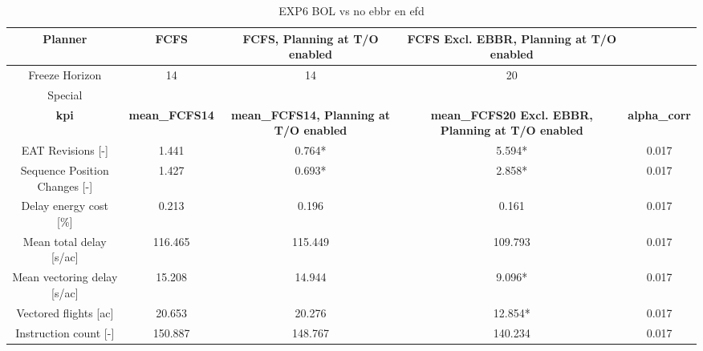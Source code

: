 \begin{table}[htbp]
\caption{EXP6 BOL vs no ebbr en efd}
\begin{center}
\footnotesize
\setlength{\tabcolsep}{3pt}
\renewcommand{\arraystretch}{1.000}
\begin{tabular}{|c|c|c|c|c|}
\hline
Planner & FCFS & FCFS, Planning at T/O enabled & FCFS Excl. EBBR, Planning at T/O enabled &  \\
\hline
Freeze Horizon & 14 & 14 & 20 &  \\
\hline
Special &  &  &  &  \\
\hline
\textbf{kpi} & \textbf{mean\_FCFS14} & \textbf{mean\_FCFS14, Planning at T/O enabled} & \textbf{mean\_FCFS20 Excl. EBBR, Planning at T/O enabled} & \textbf{alpha\_corr} \\
\hline
EAT Revisions [-] & 1.441 & 0.764* & 5.594* & 0.017 \\
\hline
Sequence Position Changes [-] & 1.427 & 0.693* & 2.858* & 0.017 \\
\hline
Delay energy cost [\%] & 0.213 & 0.196 & 0.161 & 0.017 \\
\hline
Mean total delay [s/ac] & 116.465 & 115.449 & 109.793 & 0.017 \\
\hline
Mean vectoring delay [s/ac] & 15.208 & 14.944 & 9.096* & 0.017 \\
\hline
Vectored flights [ac] & 20.653 & 20.276 & 12.854* & 0.017 \\
\hline
Instruction count [-] & 150.887 & 148.767 & 140.234 & 0.017 \\
\hline
\end{tabular}
\label{tab:exp6\_bol\_vs\_no\_ebbr\_en\_efd}
\end{center}
\end{table}